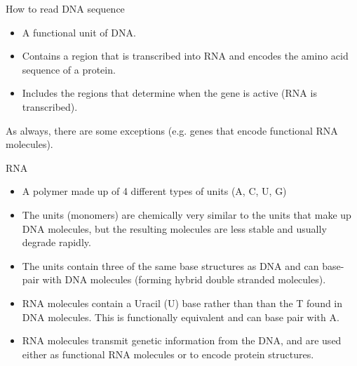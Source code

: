 \documentclass[pdf]{beamer}
\newcommand\subHeading[1]{
  \par\bigskip {\Large\bfseries#1}\par\smallskip
}
\begin{document}
\begin{frame}{How to read DNA sequence}
\subHeading{The Gene}
\begin{itemize}
  \item A functional unit of DNA.
  \item Contains a region that is transcribed into RNA
    and encodes the amino acid sequence of a protein.
  \item Includes the regions that determine when the
    gene is active (RNA is transcribed).
\end{itemize}
As always, there are some exceptions (e.g. genes that encode
functional RNA molecules).
\end{frame}

\begin{frame}{RNA}
  \subHeading{What is RNA?}
  \begin{itemize}
    \item A polymer made up of 4 different types of units (A, C, U, G)
    \item The units (monomers) are chemically very similar to the units
      that make up DNA molecules, but the resulting molecules are less
      stable and usually degrade rapidly.
    \item The units contain three of the same base structures as DNA and
      can base-pair with DNA molecules (forming hybrid double stranded molecules).
    \item RNA molecules contain a Uracil (U) base rather than than the T found in
      DNA molecules. This is functionally equivalent and can base pair with A.
    \item RNA molecules transmit genetic information from the DNA, and are used
      either as functional RNA molecules or to encode protein structures.
  \end{itemize}
\end{frame}
\end{document}
